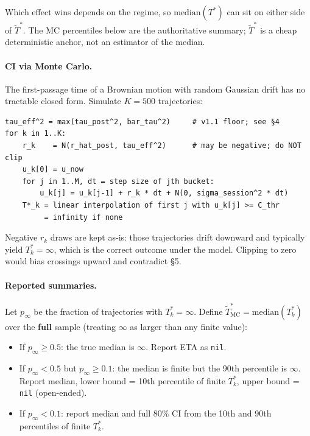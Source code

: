 \documentclass[11pt]{article}
\newcommand{\Tstar}{T^\ast}
\newcommand{\Tstark}{T^\ast_k}
\begin{document}
Which effect wins depends on the regime, so $\mathrm{median}(\Tstar)$ can
sit on either side of $\tilde\Tstar$. The MC percentiles below are the
authoritative summary; $\tilde\Tstar$ is a cheap deterministic anchor, not
an estimator of the median.

\paragraph{CI via Monte Carlo.} The first-passage time of a Brownian motion
with random Gaussian drift has no tractable closed form. Simulate $K = 500$
trajectories:

\begin{lstlisting}
tau_eff^2 = max(tau_post^2, bar_tau^2)     # v1.1 floor; see §4
for k in 1..K:
    r_k    = N(r_hat_post, tau_eff^2)      # may be negative; do NOT clip
    u_k[0] = u_now
    for j in 1..M, dt = step size of jth bucket:
        u_k[j] = u_k[j-1] + r_k * dt + N(0, sigma_session^2 * dt)
    T*_k = linear interpolation of first j with u_k[j] >= C_thr
         = infinity if none
\end{lstlisting}

Negative $r_k$ draws are kept as-is: those trajectories drift downward and
typically yield $\Tstark = \infty$, which is the correct outcome under the
model. Clipping to zero would bias crossings upward and contradict \S5.

\paragraph{Reported summaries.} Let $p_\infty$ be the fraction of
trajectories with $\Tstark = \infty$. Define $\tilde\Tstar_{\text{MC}} =
\mathrm{median}(\Tstark)$ over the \textbf{full} sample (treating $\infty$
as larger than any finite value):

\begin{itemize}
  \item If $p_\infty \geq 0.5$: the true median is $\infty$. Report ETA as
    \texttt{nil}.
  \item If $p_\infty < 0.5$ but $p_\infty \geq 0.1$: the median is finite
    but the 90th percentile is $\infty$. Report median, lower bound = 10th
    percentile of finite $\Tstark$, upper bound = \texttt{nil}
    (open-ended).
  \item If $p_\infty < 0.1$: report median and full 80\% CI from the 10th
    and 90th percentiles of finite $\Tstark$.
\end{itemize}
\end{document}
